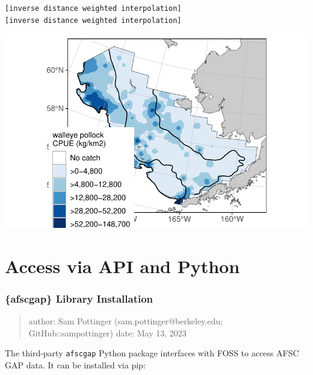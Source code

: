 \documentclass[
  letterpaper,
  oneside,
  open=any]{scrbook}
\newenvironment{Shaded}{\begin{snugshade}}{\end{snugshade}}
\newcommand{\AttributeTok}[1]{\textcolor[rgb]{0.40,0.45,0.13}{#1}}
\newcommand{\CommentTok}[1]{\textcolor[rgb]{0.37,0.37,0.37}{#1}}
\newcommand{\FunctionTok}[1]{\textcolor[rgb]{0.28,0.35,0.67}{#1}}
\newcommand{\NormalTok}[1]{\textcolor[rgb]{0.00,0.23,0.31}{#1}}
\newcommand{\SpecialCharTok}[1]{\textcolor[rgb]{0.37,0.37,0.37}{#1}}
\newcommand{\StringTok}[1]{\textcolor[rgb]{0.13,0.47,0.30}{#1}}
\begin{document}
\begin{verbatim}
[inverse distance weighted interpolation]
[inverse distance weighted interpolation]
\end{verbatim}

\begin{Shaded}
\end{Shaded}

\includegraphics{content/foss-api-r_files/figure-pdf/pollock-multi2-loc-1.pdf}

\chapter{Access via API and Python}\label{access-via-api-and-python}

\subsection{\{afscgap\} Library
Installation}\label{afscgap-library-installation}

\begin{quote}
author: Sam Pottinger (sam.pottinger@berkeley.edu; GitHub::sampottinger)
date: May 13, 2023
\end{quote}

The third-party \texttt{afscgap} Python package interfaces with FOSS to
access AFSC GAP data. It can be installed via pip:
\end{document}
